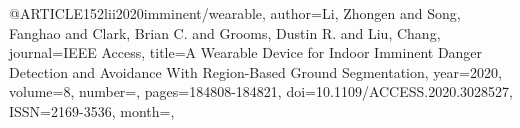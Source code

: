@ARTICLE{152lii2020imminent/wearable,
author={Li, Zhongen and Song, Fanghao and Clark, Brian C. and Grooms, Dustin R. and Liu, Chang},
journal={IEEE Access}, 
title={A Wearable Device for Indoor Imminent Danger Detection and Avoidance With Region-Based Ground Segmentation}, 
year={2020},
volume={8},
number={},
pages={184808-184821},
doi={10.1109/ACCESS.2020.3028527},
ISSN={2169-3536},
month={},}